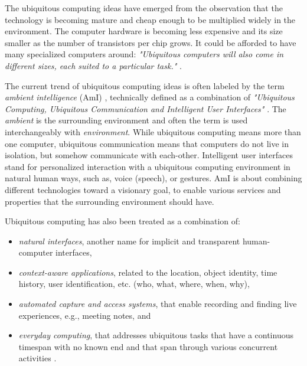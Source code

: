 The ubiquitous computing ideas have emerged from the observation that the technology is becoming mature and cheap enough to be multiplied widely in the environment. The computer hardware is becoming less expensive and its size smaller as the number of transistors per chip grows. It could be afforded to have many specialized computers around: \textit{"Ubiquitous computers will also come in different sizes, each suited to a particular task."} \cite{Weiser.01}. %

The current trend of ubiquitous computing ideas is often labeled by the term \textit{ambient intelligence} (AmI) \cite{AmI,ami2003}, technically defined as a combination of \textit{"Ubiquitous Computing, Ubiquitous Communication and Intelligent User Interfaces"} \cite{AmI}. The \textit{ambient} is the surrounding environment and often the term is used interchangeably with \textit{environment}. While ubiquitous computing means more than one computer, ubiquitous communication means that computers do not live in isolation, but somehow communicate with each-other. Intelligent user interfaces stand for personalized interaction with a ubiquitous computing environment in natural human ways, such as, voice (speech), or gestures. AmI is about combining different technologies toward a visionary goal, to enable various services and properties that the surrounding environment should have.

\noindent Ubiquitous computing has also been treated as a combination of:
\begin{itemize}
\item \textit{natural interfaces}, another name for implicit and transparent human-computer interfaces, 
\item \textit{context-aware applications}, related to the location, object identity, time history, user identification, etc. (who, what, where, when, why),
\item  \textit{automated capture and access systems}, that enable recording and finding live experiences, e.g., meeting notes, and 
\item \textit{everyday computing}, that addresses ubiquitous tasks that have a continuous timespan with no known end and that span through various concurrent activities \cite{tochi-millenium}. 
\end{itemize}

